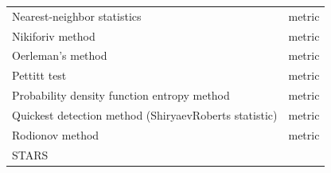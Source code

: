 \documentclass[12pt,twoside,openany]{reedthesis}
\begin{document}
\begin{longtable}[]{@{}lc@{}}
\begin{minipage}[t]{0.31\columnwidth}
Nearest-neighbor statistics\strut
\end{minipage} & \begin{minipage}[t]{0.34\columnwidth}\centering\strut
metric\strut
\end{minipage}\tabularnewline
\begin{minipage}[t]{0.31\columnwidth}\raggedright\strut
Nikiforiv method\strut
\end{minipage} & \begin{minipage}[t]{0.34\columnwidth}\centering\strut
metric\strut
\end{minipage}\tabularnewline
\begin{minipage}[t]{0.31\columnwidth}\raggedright\strut
Oerleman's method\strut
\end{minipage} & \begin{minipage}[t]{0.34\columnwidth}\centering\strut
metric\strut
\end{minipage}\tabularnewline
\begin{minipage}[t]{0.31\columnwidth}\raggedright\strut
Pettitt test\strut
\end{minipage} & \begin{minipage}[t]{0.34\columnwidth}\centering\strut
metric\strut
\end{minipage}\tabularnewline
\begin{minipage}[t]{0.31\columnwidth}\raggedright\strut
Probability density function entropy method\strut
\end{minipage} & \begin{minipage}[t]{0.34\columnwidth}\centering\strut
metric\strut
\end{minipage}\tabularnewline
\begin{minipage}[t]{0.31\columnwidth}\raggedright\strut
Quickest detection method (ShiryaevRoberts statistic)\strut
\end{minipage} & \begin{minipage}[t]{0.34\columnwidth}\centering\strut
metric\strut
\end{minipage}\tabularnewline
\begin{minipage}[t]{0.31\columnwidth}\raggedright\strut
Rodionov method\strut
\end{minipage} & \begin{minipage}[t]{0.34\columnwidth}\centering\strut
metric\strut
\end{minipage}\tabularnewline
\begin{minipage}[t]{0.31\columnwidth}\raggedright\strut
STARS\strut
\end{minipage} & \begin{minipage}[t]{0.34\columnwidth}\centering\strut

\end{minipage}
\end{longtable}
\end{document}
